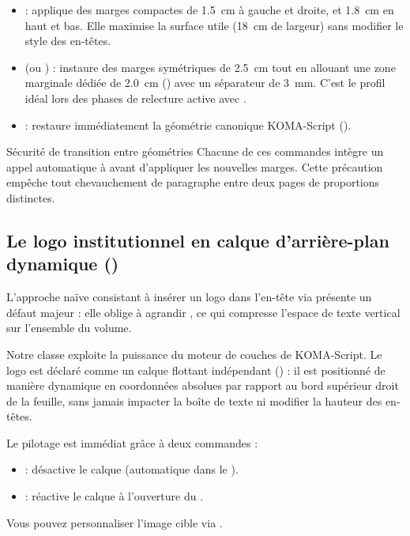 \begin{itemize}
  \item {} : applique des marges compactes de \qty{1.5}{\centi\meter} à gauche et droite,
  et \qty{1.8}{\centi\meter} en haut et bas. Elle maximise la surface utile (\qty{18}{\centi\meter} de largeur)
  sans modifier le style des en-têtes.
  \item {} (ou ) :
  instaure des marges symétriques de \qty{2.5}{\centi\meter} tout en allouant une zone marginale dédiée
  de \qty{2.0}{\centi\meter} () avec un séparateur de \qty{3}{\milli\meter}.
  C'est le profil idéal lors des phases de relecture active avec .
  \item {} : restaure immédiatement la géométrie canonique KOMA-Script ().
\end{itemize}

\begin{boiteSynthese}{Sécurité de transition entre géométries}
Chacune de ces commandes intègre un appel automatique à  avant d'appliquer les nouvelles marges.
Cette précaution empêche tout chevauchement de paragraphe entre deux pages de proportions distinctes.
\end{boiteSynthese}

\subsection{Le logo institutionnel en calque d'arrière-plan dynamique ()}
L'approche naïve consistant à insérer un logo dans l'en-tête via 
présente un défaut majeur : elle oblige à agrandir ,
ce qui compresse l'espace de texte vertical sur l'ensemble du volume.

Notre classe exploite la puissance du moteur de couches  de KOMA-Script.
Le logo est déclaré comme un calque flottant indépendant () :
il est positionné de manière dynamique en coordonnées absolues par rapport au bord supérieur droit de la feuille,
sans jamais impacter la boîte de texte ni modifier la hauteur des en-têtes.

Le pilotage est immédiat grâce à deux commandes :
\begin{itemize}
  \item {} : désactive le calque (automatique dans le ).
  \item {} : réactive le calque à l'ouverture du .
\end{itemize}
Vous pouvez personnaliser l'image cible via .

